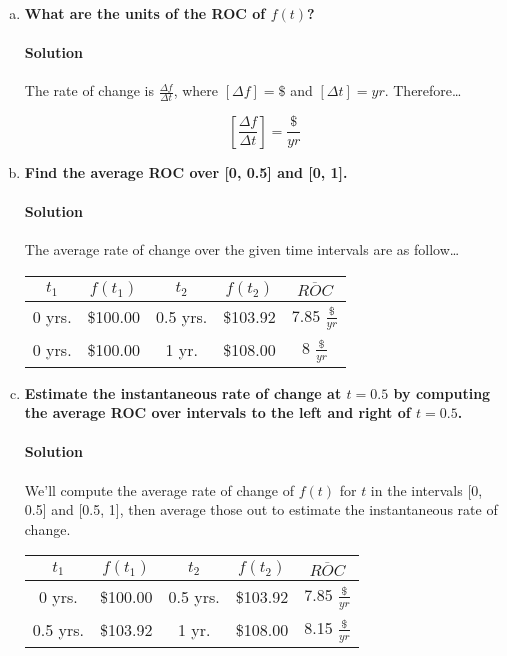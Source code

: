 \documentclass{article}
\begin{document}
  \begin{enumerate}[(a)]
    \item \textbf{What are the units of the ROC of \(f(t)\)?}
    \paragraph{Solution} The rate of change is \(\frac{\Delta{f}}{\Delta{t}}\), where \([\Delta{f}] = \$\) and \([\Delta{t}] = yr\). Therefore\dots
  
    \begin{equation}
      \boxed{[\frac{\Delta{f}}{\Delta{t}}] = \frac{\$}{yr}}
    \end{equation}

    \item \textbf{Find the average ROC over [0, 0.5] and [0, 1].}
    \paragraph{Solution} The average rate of change over the given time intervals are as follow\dots

    \begin{center}
      \begin{tabular}{||c c c c | c||}
      \hline
      \(t_{1}\) & \(f(t_{1})\) & \(t_{2}\) & \(f(t_{2})\) & \(\overline{ROC}\) \\
      \hline\hline
      0 yrs. & \$100.00 & 0.5 yrs. & \$103.92 & 7.85 \(\frac{\$}{yr}\) \\
      \hline
      0 yrs. & \$100.00 & 1 yr. & \$108.00 & 8 \(\frac{\$}{yr}\) \\
      \hline
      \end{tabular}
    \end{center}

    \item \textbf{Estimate the instantaneous rate of change at \(t=0.5\) by computing the average ROC over intervals to the left and right of \(t=0.5\).}

    \paragraph{Solution} We'll compute the average rate of change of \(f(t)\) for \(t\) in the intervals [0, 0.5] and [0.5, 1], then average those out to estimate the instantaneous rate of change.

    \begin{center}
      \begin{tabular}{||c c c c | c||}
      \hline
      \(t_{1}\) & \(f(t_{1})\) & \(t_{2}\) & \(f(t_{2})\) & \(\overline{ROC}\) \\
      \hline\hline
      0 yrs. & \$100.00 & 0.5 yrs. & \$103.92 & 7.85 \(\frac{\$}{yr}\) \\
      \hline
      0.5 yrs. & \$103.92 & 1 yr. & \$108.00 & 8.15 \(\frac{\$}{yr}\) \\
      \hline
      \end{tabular}
    \end{center}


\end{enumerate}
\end{document}
